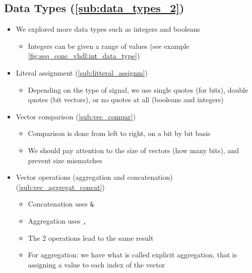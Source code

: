 \subsection{Data Types (\ref{sub:data_types_2})} 

\begin{itemize}

\item We explored more data types such as integers and booleans

	\begin{itemize}
	\item Integers can be given a range of values (see example \autoref{fig:seq_conc_vhdl:int_data_type})
	\end{itemize}

\item Literal assignment (\ref{sub:litteral_assignm})

	\begin{itemize}
	\item Depending on the type of signal, we use single quotes (for bits), double quotes (bit vectors), or no quotes at all (booleans and integers)
	\end{itemize}

\item Vector comparison (\ref{sub:vec_compar})

	\begin{itemize}
	\item Comparison is done from left to right, on a bit by bit basis
	
	\item We should pay attention to the size of vectors (how many bits), and prevent size mismatches
	\end{itemize}


\item Vector operations (aggregation and concatenation) (\ref{sub:vec_aggregat_concat})

	\begin{itemize}
	\item Concatenation uses \verb|&|

	\item Aggregation uses \verb|,|
	
	\item The 2 operations lead to the same result
	
	
	\item For aggregation: we have what is called explicit aggregation, that is assigning a value to each index of the vector
	

\end{itemize}
\end{itemize}
